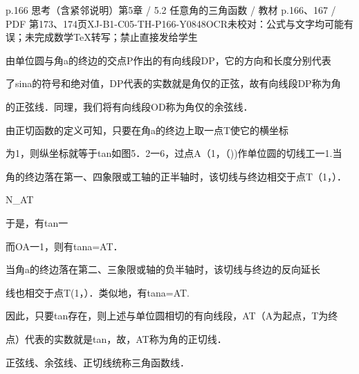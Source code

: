 \begin{bankitem}{p.166 思考（含紧邻说明）}{第5章 / 5.2 任意角的三角函数 / 教材 p.166、167 / PDF 第173、174页}{XJ-B1-C05-TH-P166-Y0848}{OCR未校对：公式与文字均可能有误；未完成数学TeX转写；禁止直接发给学生}
\begin{ocrdraft}
由单位圆与角a的终边的交点P作出的有向线段DP，它的方向和长度分别代表
\par
了sina的符号和绝对值，DP代表的实数就是角仅的正弦，故有向线段DP称为角
\par
的正弦线．同理，我们将有向线段OD称为角仅的余弦线．
\par
由正切函数的定义可知，只要在角a的终边上取一点T使它的横坐标
\par
为1，则纵坐标就等于tan如图5．2一6，过点A（1，（))作单位圆的切线工一1.当
\par
角的终边落在第一、四象限或工轴的正半轴时，该切线与终边相交于点T（1，）．
\par
N\_AT
\par
于是，有tan一
\par
而OA一1，则有tana=AT．
\par
当角a的终边落在第二、三象限或轴的负半轴时，该切线与终边的反向延长
\par
线也相交于点T(1，）．类似地，有tana=AT.
\par
因此，只要tan存在，则上述与单位圆相切的有向线段，AT（A为起点，T为终
\par
点）代表的实数就是tan，故，AT称为角的正切线．
\par
正弦线、余弦线、正切线统称三角函数线．
\end{ocrdraft}
\end{bankitem}
